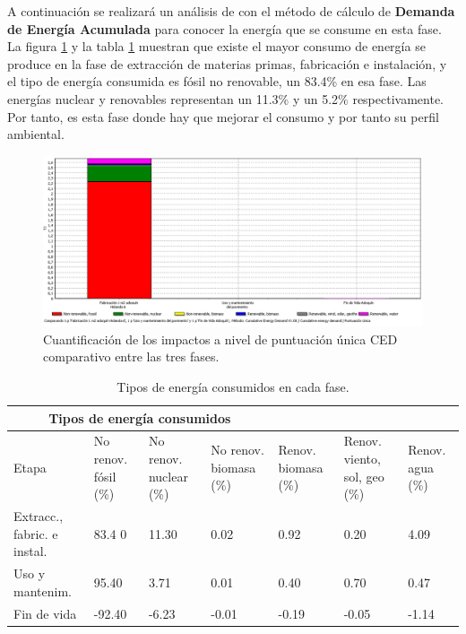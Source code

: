 A continuación se realizará un análisis de con el método de cálculo de \textbf{Demanda de Energía Acumulada} para conocer la energía que se consume en esta fase. La figura \ref{fig:ced_puntuacionunica} y la tabla \ref{tiposenergiaced} muestran que existe el mayor consumo de energía se produce en la fase de extracción de materias primas, fabricación e instalación, y el tipo de energía consumida es fósil no renovable, un 83.4\% en esa fase. Las energías nuclear y renovables representan un 11.3\% y un 5.2\% respectivamente. Por tanto, es esta fase donde hay que mejorar el consumo y por tanto su perfil ambiental.


\begin{figure}[!htb]
\centering
\includegraphics[width=15cm]{img/ced_puntuacionunica.png}
\caption{Cuantificación de los impactos a nivel de puntuación única CED comparativo entre las tres fases.}
\label{fig:ced_puntuacionunica}
\end{figure}

\begin{table}[!htb]
\centering
\begin{tabular}{p{2cm}p{2cm}p{2cm}p{2cm}p{2cm}p{2cm}p{2cm}}
\toprule
\multicolumn{4}{c}{Tipos de energía consumidos}\\
\midrule
Etapa & No renov. fósil (\%) & No renov. nuclear (\%) & No renov. biomasa (\%) & Renov. biomasa (\%) & Renov. viento, sol, geo (\%) & Renov. agua (\%)\\
\midrule
Extracc., fabric. e instal. & 83.4 0& 11.30 & 0.02 & 0.92 & 0.20 & 4.09\\
Uso y mantenim. & 95.40 & 3.71 & 0.01 & 0.40 & 0.70 & 0.47 \\
Fin de vida & -92.40 & -6.23 & -0.01 & -0.19 & -0.05 & -1.14 \\
\bottomrule
\end{tabular}
\caption{Tipos de energía consumidos en cada fase.}
\label{tiposenergiaced}
\end{table}

